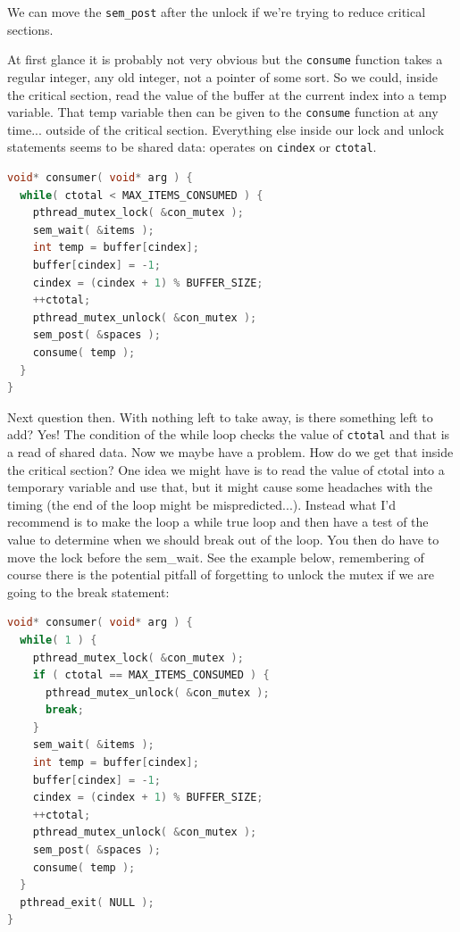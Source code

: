 \documentclass[a4paper]{report}
\begin{document}
We can move the {\tt sem\_post} after the unlock if we're trying to reduce critical sections.

At first glance it is probably not very obvious but the \texttt{consume} function takes a regular integer, any old integer, not a pointer of some sort. So we could, inside the critical section, read the value of the buffer at the current index into a temp variable. That temp variable then can be given to the \texttt{consume} function at any time... outside of the critical section. Everything else inside our lock and unlock statements seems to be shared data: operates on \texttt{cindex} or \texttt{ctotal}.

\begin{lstlisting}[language=C]
void* consumer( void* arg ) { 
  while( ctotal < MAX_ITEMS_CONSUMED ) {
    pthread_mutex_lock( &con_mutex );
    sem_wait( &items );
    int temp = buffer[cindex];
    buffer[cindex] = -1;
    cindex = (cindex + 1) % BUFFER_SIZE;
    ++ctotal;
    pthread_mutex_unlock( &con_mutex );
    sem_post( &spaces );
    consume( temp );
  }
}
\end{lstlisting}

Next question then. With nothing left to take away, is there something left to add? Yes! The condition of the while loop checks the value of \texttt{ctotal} and that is a read of shared data. Now we maybe have a problem. How do we get that inside the critical section? One idea we might have is to read the value of ctotal into a temporary variable and use that, but it might cause some headaches with the timing (the end of the loop might be mispredicted...).  Instead what I'd recommend is to make the loop a while true loop and then have a test of the value to determine when we should break out of the loop. You then do have to move the lock before the sem\_wait. See the example below, remembering of course there is the potential pitfall of forgetting to unlock the mutex if we are going to the break statement:

\begin{lstlisting}[language=C]
void* consumer( void* arg ) { 
  while( 1 ) { 
    pthread_mutex_lock( &con_mutex );  
    if ( ctotal == MAX_ITEMS_CONSUMED ) {
      pthread_mutex_unlock( &con_mutex );
      break;
    }   
    sem_wait( &items );
    int temp = buffer[cindex];
    buffer[cindex] = -1; 
    cindex = (cindex + 1) % BUFFER_SIZE;
    ++ctotal;
    pthread_mutex_unlock( &con_mutex );
    sem_post( &spaces );
    consume( temp );
  }
  pthread_exit( NULL );
}
\end{lstlisting}
\end{document}
